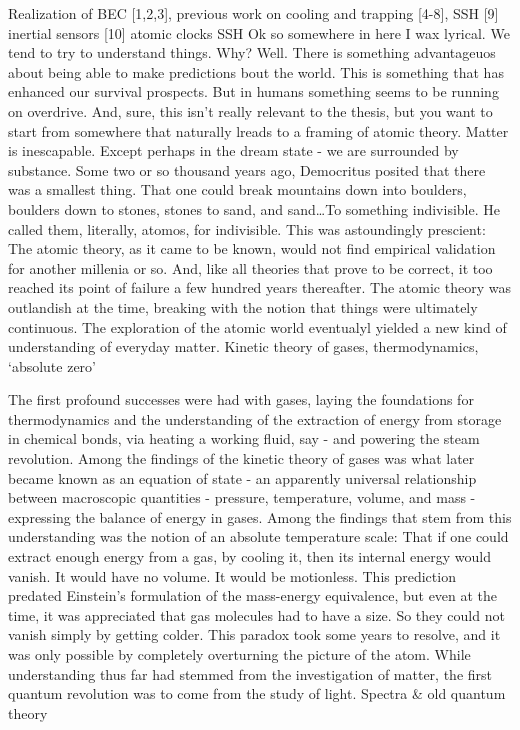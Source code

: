 Realization of BEC [1,2,3], previous work on cooling and trapping [4-8], SSH 
		[9] inertial sensors [10] atomic clocks SSH
Ok so somewhere in here I wax lyrical. We tend to try to understand
things. Why? Well. There is something advantageuos about being able to
make predictions bout the world. This is something that has enhanced our
survival prospects. But in humans something seems to be running on
overdrive. And, sure, this isn't really relevant to the thesis, but you
want to start from somewhere that naturally lreads to a framing of
atomic theory. Matter is inescapable. Except perhaps in the dream state
- we are surrounded by substance. Some two or so thousand years ago,
Democritus posited that there was a smallest thing. That one could break
mountains down into boulders, boulders down to stones, stones to sand,
and sand\ldots To something indivisible. He called them, literally,
atomos, for indivisible. This was astoundingly prescient: The atomic
theory, as it came to be known, would not find empirical validation for
another millenia or so. And, like all theories that prove to be correct,
it too reached its point of failure a few hundred years thereafter. The
atomic theory was outlandish at the time, breaking with the notion that
things were ultimately continuous. The exploration of the atomic world
eventualyl yielded a new kind of understanding of everyday matter.
Kinetic theory of gases, thermodynamics, `absolute zero'


The first profound successes were had with gases, laying the foundations
for thermodynamics and the understanding of the extraction of energy
from storage in chemical bonds, via heating a working fluid, say - and
powering the steam revolution. Among the findings of the kinetic theory
of gases was what later became known as an equation of state - an
apparently universal relationship between macroscopic quantities -
pressure, temperature, volume, and mass - expressing the balance of
energy in gases. Among the findings that stem from this understanding
was the notion of an absolute temperature scale: That if one could
extract enough energy from a gas, by cooling it, then its internal
energy would vanish. It would have no volume. It would be motionless.
This prediction predated Einstein's formulation of the mass-energy
equivalence, but even at the time, it was appreciated that gas molecules
had to have a size. So they could not vanish simply by getting colder.
This paradox took some years to resolve, and it was only possible by
completely overturning the picture of the atom. While understanding thus
far had stemmed from the investigation of matter, the first quantum
revolution was to come from the study of light. Spectra \& old quantum
theory

